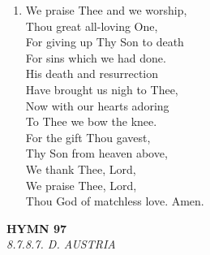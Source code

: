 \documentclass[11pt,a4paper]{article}
\begin{document}
\begin{enumerate}
    \item We praise Thee and we worship, \\
        Thou great all-loving One, \\
        For giving up Thy Son to death \\
        For sins which we had done. \\
        His death and resurrection \\
        Have brought us nigh to Thee, \\
        Now with our hearts adoring \\
        To Thee we bow the knee. \\
        For the gift Thou gavest, \\
        Thy Son from heaven above, \\
        We thank Thee, Lord, \\
        We praise Thee, Lord, \\
        Thou God of matchless love. Amen.

\end{enumerate}

\newpage
\begin{center}
    {\Large \textbf{HYMN 97\textdagger{}}}
    \\
    \textit{8.7.8.7. D. AUSTRIA}
\end{center}
\vspace{1em}
\end{document}
